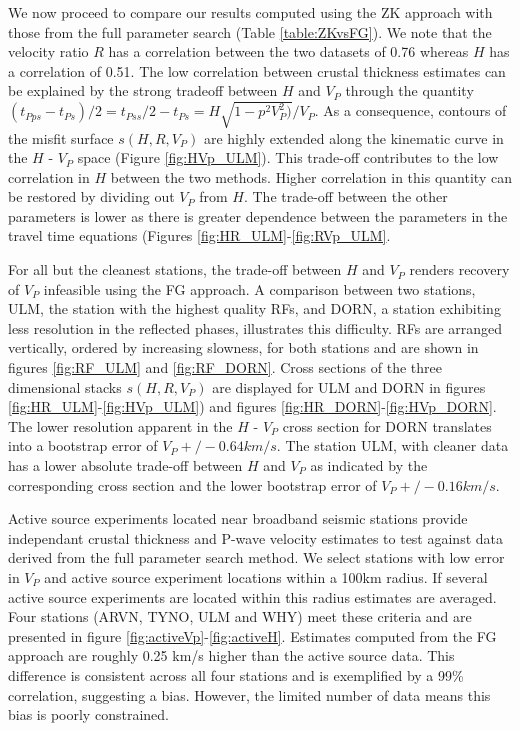 \documentclass[draft, 12pt]{article}
\begin{document}
We now proceed to compare our results computed using the ZK approach with those from the full parameter search (Table \ref{table:ZKvsFG}). We note that the velocity ratio $R$ has a correlation between the two datasets of 0.76 whereas $H$ has a correlation of 0.51. The low correlation between crustal thickness estimates can be explained by the strong tradeoff between $H$ and $V_P$ through the quantity $(t_{Pps}-t_{Ps})/2=t_{Pss}/2-t_{Ps}=H\sqrt{1-p^2V^2_P)}/V_P$. As a consequence, contours of the misfit surface $s(H,R,V_P)$ are highly extended along the kinematic curve in the $H$ - $V_P$ space (Figure \ref{fig:HVp_ULM}). This trade-off contributes to the low correlation in $H$ between the two methods. Higher correlation in this quantity can be restored by dividing out $V_P$ from $H$. The trade-off between the other parameters is lower as there is greater dependence between the parameters in the travel time equations (Figures \ref{fig:HR_ULM}-\ref{fig:RVp_ULM}.

For all but the cleanest stations, the trade-off between $H$ and $V_P$ renders recovery of $V_P$ infeasible using the FG approach. A comparison between two stations, ULM, the station with the highest quality RFs, and DORN, a station exhibiting less resolution in the reflected phases, illustrates this difficulty. RFs are arranged vertically, ordered by increasing slowness, for both stations and are shown in figures \ref{fig:RF_ULM} and \ref{fig:RF_DORN}. Cross sections of the three dimensional stacks $s(H,R,V_P)$  are displayed for ULM and DORN in figures \ref{fig:HR_ULM}-\ref{fig:HVp_ULM}) and figures \ref{fig:HR_DORN}-\ref{fig:HVp_DORN}. The lower resolution apparent in the $H$ - $V_P$ cross section for DORN translates into a bootstrap error of $V_P +/- 0.64 km/s$. The station ULM, with cleaner data has a lower absolute trade-off between $H$ and $V_P$ as indicated by the corresponding cross section and the lower bootstrap error of $V_P +/- 0.16 km/s$.

Active source experiments located near broadband seismic stations provide independant crustal thickness and P-wave velocity estimates to test against data derived from the full parameter search method. We select stations with low error in $V_P$ and active source experiment locations within a 100km radius. If several active source experiments are located within this radius estimates are averaged. Four stations (ARVN, TYNO, ULM and WHY) meet these criteria and are presented in figure \ref{fig:activeVp}-\ref{fig:activeH}. Estimates computed from the FG approach are roughly 0.25 km/s higher than the active source data. This difference is consistent across all four stations and is exemplified by a 99\% correlation, suggesting a bias. However, the limited number of data means this bias is poorly constrained.
\end{document}
